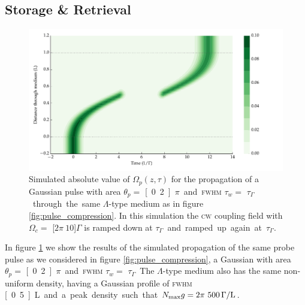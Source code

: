 
  \subsection{Storage \& Retrieval}

    \begin{figure}[]
      \includegraphics[width=\linewidth]
        {figs/04_polaritons/pls_p0_2pi_t1_Ng5e3_c10_gaussian_w0_5_storage_4_fig1.pdf}
      \caption{
        Simulated absolute value of $\Omega_p(z, \tau)$ for the propagation of a
        Gaussian pulse with area $\theta_p = $ \unit[0.2]{$\pi$} and
        \textsc{fwhm} $\tau_w = $ \unit[1]{$\tau_\Gamma$} through the same
        $\Lambda$-type medium as in figure \ref{fig:pulse_compression}.
        In this simulation the \textsc{cw} coupling field with $\Omega_c = $
        \unit[$2\pi~10$]{$\Gamma$} is ramped down at  \unit[4]{$\tau_\Gamma$}
        and ramped up again at \unit[8]{$\tau_\Gamma$}.
      }
      \label{fig:eit_storage}
    \end{figure}

    In figure \ref{fig:eit_storage} we show the results of the simulated
    propagation of the same probe pulse as we considered in figure
    \ref{fig:pulse_compression}, a Gaussian with area $\theta_p = $
    \unit[0.2]{$\pi$} and \textsc{fwhm} $\tau_w = $ \unit[1]{$\tau_\Gamma$}. The
    $\Lambda$-type medium also has the same non-uniform density, having a
    Gaussian profile of \textsc{fwhm} \unit[0.5]{L} and a peak density such that
    $N_{\mathrm{max}} g = \unit[2\pi~500]{\Gamma/L}$.

